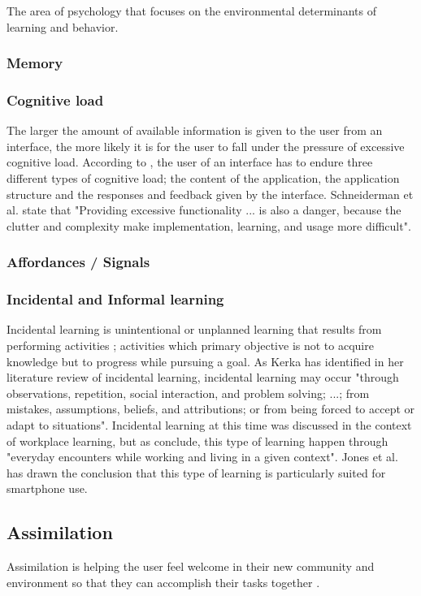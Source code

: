 The area of psychology that focuses on the environmental determinants of learning and behavior.

\subsubsection{Memory}

\subsubsection{Cognitive load}
The larger the amount of available information is given to the user from an interface, the more likely it is for the user to fall under the pressure of excessive cognitive load. According to \cite{Jih1992}, the user of an interface has to endure three different types of cognitive load; the content of the application, the application structure and the responses and feedback given by the interface. Schneiderman et al. state that "Providing excessive functionality ... is also a danger, because the clutter and complexity make implementation, learning, and usage more difficult".

\subsubsection{Affordances / Signals}

\subsubsection{Incidental and Informal learning}
Incidental learning is unintentional or unplanned learning that results from performing activities \cite{Kerka2000}; activities which primary objective is not to acquire knowledge but to progress while pursuing a goal. As Kerka \cite{Kerka2000} has identified in her literature review of incidental learning, incidental learning may occur "through observations, repetition, social interaction, and problem solving; ...; from mistakes, assumptions, beliefs, and attributions; or from being forced to accept or adapt to situations". Incidental learning at this time was discussed in the context of workplace learning, but as \cite{Marsick2001} conclude, this type of learning happen through "everyday encounters while working and living in a given context". Jones et al. \cite{Jones2014} has drawn the conclusion that this type of learning is particularly suited for smartphone use.

\subsection{Assimilation}
\label{sec:assimilation}
Assimilation is helping the user feel welcome in their new community and environment so that they can accomplish their tasks together \cite{Bradt2009}.

